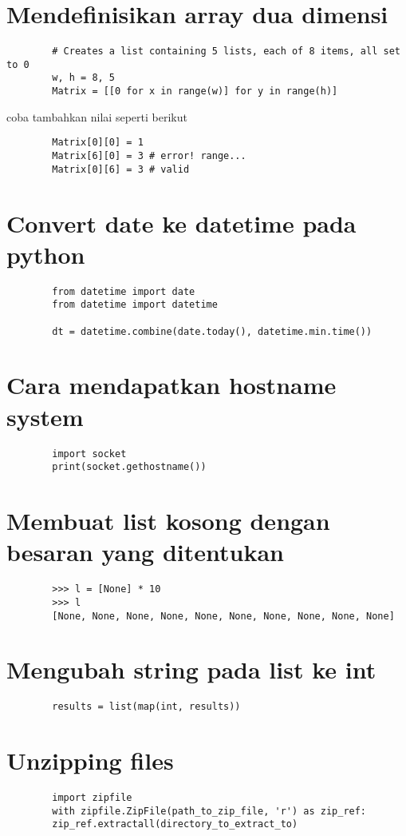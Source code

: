 \documentclass{article}
\begin{document}
	\section {Mendefinisikan array dua dimensi}
	\begin{lstlisting}
		# Creates a list containing 5 lists, each of 8 items, all set to 0
		w, h = 8, 5
		Matrix = [[0 for x in range(w)] for y in range(h)] 
	\end{lstlisting}
	coba tambahkan nilai seperti berikut
	\begin{lstlisting}
		Matrix[0][0] = 1
		Matrix[6][0] = 3 # error! range... 
		Matrix[0][6] = 3 # valid
	\end{lstlisting}
	
	\section {Convert date ke datetime pada python}
	\begin{lstlisting}
		from datetime import date
		from datetime import datetime
		
		dt = datetime.combine(date.today(), datetime.min.time())
	\end{lstlisting}
	
	\section {Cara mendapatkan hostname system}
	\begin{lstlisting}
		import socket
		print(socket.gethostname())
	\end{lstlisting}
	
	\section {Membuat list kosong dengan besaran yang ditentukan}
	\begin{lstlisting}
		>>> l = [None] * 10
		>>> l
		[None, None, None, None, None, None, None, None, None, None]
	\end{lstlisting}

	\section {Mengubah string pada list ke int}
	\begin{lstlisting}
		results = list(map(int, results))
	\end{lstlisting}
	
	\section {Unzipping files}
	\begin{lstlisting}
		import zipfile
		with zipfile.ZipFile(path_to_zip_file, 'r') as zip_ref:
		zip_ref.extractall(directory_to_extract_to)
	\end{lstlisting}
	
\end{document}
